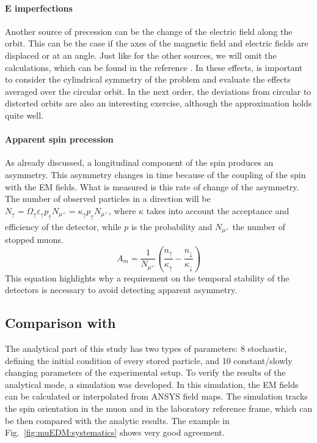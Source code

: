 \begin{refsection}
        \paragraph{$\bm{E}$ imperfections} Another source of precession can be the change of the electric field along the orbit.
        This can be the case if the axes of the magnetic field and electric fields are displaced or at an angle.
        Just like for the other sources, we will omit the calculations, which can be found in the reference \cite{chavdar:2023}. 
        In these effects, is important to consider the cylindrical symmetry of the problem and evaluate the effects averaged over the circular orbit.
        In the next order, the deviations from circular to distorted orbits are also an interesting exercise, although the approximation holds quite well.

        \paragraph{Apparent spin precession} As already discussed, a longitudinal component of the spin produces an asymmetry. 
        This asymmetry changes in time because of the coupling of the spin with the EM fields. 
        What is measured is this rate of change of the asymmetry.
        The number of observed particles in a direction will be $N_\uparrow = \Omega_\uparrow\varepsilon_\uparrow p_\uparrow N_{\mu^+} =  \kappa_\uparrow p_\uparrow N_{\mu^+}$, where $\kappa$ takes into account the acceptance and efficiency of the detector, while $p$ is the probability and $N_{\mu^+}$ the number of stopped muons.
        \begin{equation}
            A_m = \frac{1}{N_{\mu^+}} \left( \frac{n_\uparrow}{\kappa_\uparrow} - \frac{n_\downarrow}{\kappa_\downarrow} \right)
        \end{equation}
        This equation highlights why a requirement on the temporal stability of the detectors is necessary to avoid detecting apparent asymmetry.

    \subsection{Comparison with \gf}
        The analytical part of this study has two types of parameters: 8 stochastic, defining the initial condition of every stored particle, and 10 constant/slowly changing parameters of the experimental setup. 
        To verify the results of the analytical mode, a \gf simulation was developed.
        In this simulation, the EM fields can be calculated or interpolated from ANSYS field maps.
        The simulation tracks the spin orientation in the muon and in the laboratory reference frame, which can be then compared with the analytic results.
        The example in Fig.~\ref{fig:muEDM:systematics} shows very good agreement.


\end{refsection}

